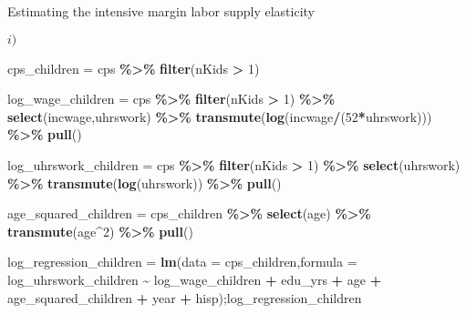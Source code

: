 \documentclass[
  ignorenonframetext,
]{beamer}
\newenvironment{Shaded}{\begin{snugshade}}{\end{snugshade}}
\newcommand{\DataTypeTok}[1]{\textcolor[rgb]{0.13,0.29,0.53}{#1}}
\newcommand{\DecValTok}[1]{\textcolor[rgb]{0.00,0.00,0.81}{#1}}
\newcommand{\KeywordTok}[1]{\textcolor[rgb]{0.13,0.29,0.53}{\textbf{#1}}}
\newcommand{\NormalTok}[1]{#1}
\newcommand{\OperatorTok}[1]{\textcolor[rgb]{0.81,0.36,0.00}{\textbf{#1}}}
\newcommand{\StringTok}[1]{\textcolor[rgb]{0.31,0.60,0.02}{#1}}
\begin{document}
\begin{frame}[fragile]{Estimating the intensive margin labor supply
elasticity}
\begin{block}{\(i)\)}
\begin{Shaded}
\begin{Highlighting}[]
\NormalTok{cps\_children =}\StringTok{ }\NormalTok{cps }\OperatorTok{\%\textgreater{}\%}
\StringTok{  }\KeywordTok{filter}\NormalTok{(nKids }\OperatorTok{\textgreater{}}\StringTok{ }\DecValTok{1}\NormalTok{)}

\NormalTok{log\_wage\_children =}\StringTok{ }\NormalTok{cps }\OperatorTok{\%\textgreater{}\%}
\StringTok{  }\KeywordTok{filter}\NormalTok{(nKids }\OperatorTok{\textgreater{}}\StringTok{ }\DecValTok{1}\NormalTok{) }\OperatorTok{\%\textgreater{}\%}
\StringTok{  }\KeywordTok{select}\NormalTok{(incwage,uhrswork) }\OperatorTok{\%\textgreater{}\%}
\StringTok{  }\KeywordTok{transmute}\NormalTok{(}\KeywordTok{log}\NormalTok{(incwage}\OperatorTok{/}\NormalTok{(}\DecValTok{52}\OperatorTok{*}\NormalTok{uhrswork))) }\OperatorTok{\%\textgreater{}\%}
\StringTok{  }\KeywordTok{pull}\NormalTok{()}


\NormalTok{log\_uhrswork\_children =}\StringTok{ }\NormalTok{cps }\OperatorTok{\%\textgreater{}\%}
\StringTok{  }\KeywordTok{filter}\NormalTok{(nKids }\OperatorTok{\textgreater{}}\StringTok{ }\DecValTok{1}\NormalTok{) }\OperatorTok{\%\textgreater{}\%}
\StringTok{  }\KeywordTok{select}\NormalTok{(uhrswork) }\OperatorTok{\%\textgreater{}\%}
\StringTok{  }\KeywordTok{transmute}\NormalTok{(}\KeywordTok{log}\NormalTok{(uhrswork)) }\OperatorTok{\%\textgreater{}\%}
\StringTok{  }\KeywordTok{pull}\NormalTok{()}

\NormalTok{age\_squared\_children =}\StringTok{ }\NormalTok{cps\_children }\OperatorTok{\%\textgreater{}\%}
\StringTok{  }\KeywordTok{select}\NormalTok{(age) }\OperatorTok{\%\textgreater{}\%}
\StringTok{  }\KeywordTok{transmute}\NormalTok{(age}\OperatorTok{\^{}}\DecValTok{2}\NormalTok{) }\OperatorTok{\%\textgreater{}\%}
\StringTok{  }\KeywordTok{pull}\NormalTok{()}
\end{Highlighting}
\end{Shaded}

\begin{Shaded}
\begin{Highlighting}[]
\NormalTok{log\_regression\_children =}\StringTok{ }\KeywordTok{lm}\NormalTok{(}\DataTypeTok{data =}\NormalTok{ cps\_children,}\DataTypeTok{formula =}\NormalTok{ log\_uhrswork\_children }\OperatorTok{\textasciitilde{}}\StringTok{ }\NormalTok{log\_wage\_children }\OperatorTok{+}\StringTok{ }\NormalTok{edu\_yrs }\OperatorTok{+}\StringTok{ }\NormalTok{age }\OperatorTok{+}\StringTok{ }\NormalTok{age\_squared\_children }\OperatorTok{+}\StringTok{ }\NormalTok{year }\OperatorTok{+}\StringTok{ }\NormalTok{hisp);log\_regression\_children}
\end{Highlighting}
\end{Shaded}


\end{block}
\end{frame}
\end{document}
